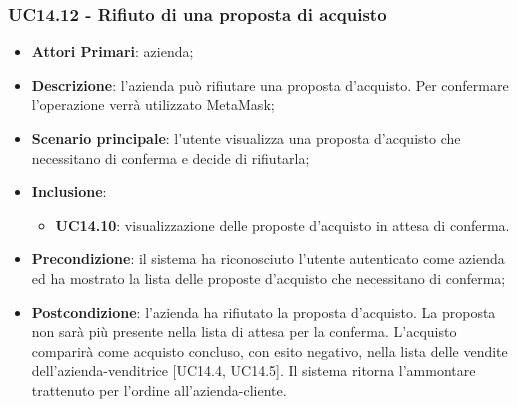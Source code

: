 \subsubsection{UC14.12 - Rifiuto di una proposta di acquisto}
\begin{itemize}
	\item \textbf{Attori Primari}: azienda;
	\item \textbf{Descrizione}: l'azienda può rifiutare una proposta d'acquisto. Per confermare l'operazione verrà utilizzato MetaMask\glo;
	\item \textbf{Scenario principale}: l'utente visualizza una proposta d'acquisto che necessitano di conferma e decide di rifiutarla;
		\item \textbf{Inclusione}: 
	\begin{itemize}
		\item \textbf{UC14.10}: visualizzazione delle proposte d'acquisto in attesa di conferma.
	\end{itemize}
	\item \textbf{Precondizione}: il sistema ha riconosciuto l'utente autenticato come azienda ed ha mostrato la lista delle proposte d'acquisto che necessitano di conferma;
	\item \textbf{Postcondizione}: l'azienda ha rifiutato la proposta d'acquisto. La proposta non sarà più presente nella lista di attesa per la conferma. L'acquisto comparirà come acquisto concluso, con esito negativo, nella lista delle vendite dell'azienda-venditrice [UC14.4, UC14.5]. Il sistema ritorna l'ammontare trattenuto per l'ordine all'azienda-cliente.
\end{itemize}
